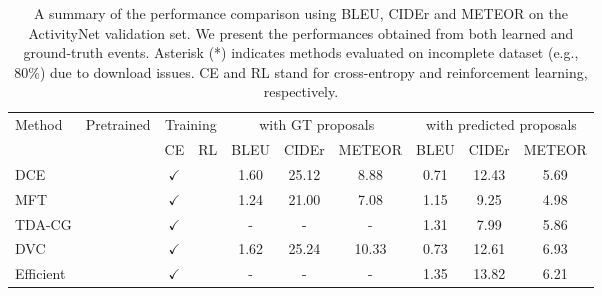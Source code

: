 \begin{sidewaystable}
  \centering
  \caption{
    A summary of the performance comparison using BLEU, CIDEr and METEOR on the ActivityNet validation set.
    We present the performances obtained from both learned and ground-truth events.
    Asterisk (*) indicates methods evaluated on incomplete dataset (e.g., 80\%) due to download issues.
    CE and RL stand for cross-entropy and reinforcement learning, respectively.
  }
  \begin{tabular}{@{}l|c|cc|ccc|ccc@{}}
    \hline
    \multirow{2}{*}{Method}             & \multirow{2}{*}{Pretrained} & \multicolumn{2}{|c|}{Training} & \multicolumn{3}{|c|}{with GT proposals} & \multicolumn{3}{c}{with predicted proposals}                                                 \\
                                        &                             & CE                             & RL                                      & BLEU                                         & CIDEr   & METEOR  & BLEU   & CIDEr   & METEOR \\
    \hline
    DCE \cite{krishna2017dense}         &                             & $\checkmark$                   &                                         & 1.60                                         & 25.12   & 8.88    & 0.71   & 12.43   & 5.69   \\
    MFT \cite{xiong2018move}            &                             & $\checkmark$                   &                                         & 1.24                                         & 21.00   & 7.08    & 1.15   & 9.25    & 4.98   \\
    TDA-CG \cite{wang2018bidirectional} &                             & $\checkmark$                   &                                         & -                                            & -       & -       & 1.31   & 7.99    & 5.86   \\
    DVC \cite{li2018jointly}            &                             & $\checkmark$                   &                                         & 1.62                                         & 25.24   & 10.33   & 0.73   & 12.61   & 6.93   \\
    Efficient \cite{suin2020efficient}  &                             & $\checkmark$                   &                                         & -                                            & -       & -       & 1.35   & 13.82   & 6.21   \\

\end{tabular}
\end{sidewaystable}
